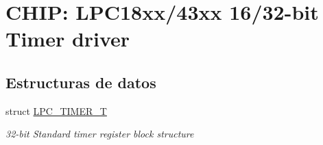 \hypertarget{group___t_i_m_e_r__18_x_x__43_x_x}{}\section{C\+H\+IP\+: L\+P\+C18xx/43xx 16/32-\/bit Timer driver}
\label{group___t_i_m_e_r__18_x_x__43_x_x}
\subsection*{Estructuras de datos}
\begin{DoxyCompactItemize}
\item 
struct \hyperlink{struct_l_p_c___t_i_m_e_r___t}{L\+P\+C\+\_\+\+T\+I\+M\+E\+R\+\_\+T}
\begin{DoxyCompactList}\small\item\em 32-\/bit Standard timer register block structure \end{DoxyCompactList}\end{DoxyCompactItemize}
